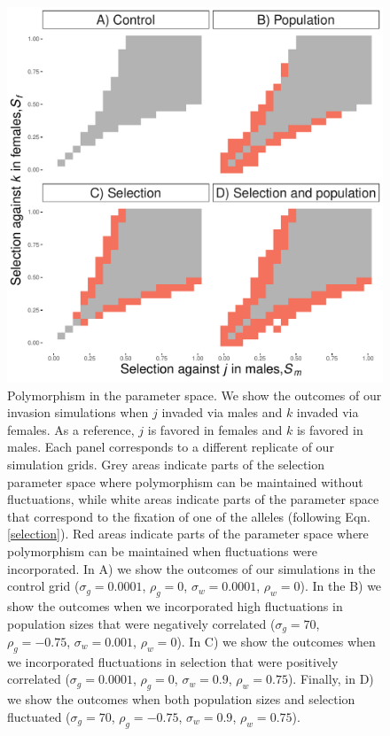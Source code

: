 \documentclass[12pt]{article}
\begin{document}
\begin{figure}[H]
  \centerline{\includegraphics[width=1\textwidth]{outcomes.pdf}}
  \caption{  Polymorphism in the parameter space. We show the outcomes of our invasion simulations  when $j$ invaded via males and $k$ invaded via females. As a reference, $j$ is favored in females and $k$ is favored in males. Each panel corresponds to a different replicate of our simulation grids. Grey areas indicate parts of the selection parameter space where polymorphism can be maintained without fluctuations, while white areas indicate parts of the parameter space that correspond to the fixation of one of the alleles (following Eqn.\ref{selection}). Red areas indicate parts of the parameter space where polymorphism can be maintained when fluctuations were incorporated. In A) we show the outcomes of our simulations in the control grid ($\sigma_{g}=0.0001$, $\rho_{g}=0$, $\sigma_{w}=0.0001$, $\rho_{w}=0$). In the B) we show the outcomes when we incorporated high fluctuations in population sizes that were negatively correlated ($\sigma_{g}=70$, $\rho_{g}=-0.75$, $\sigma_{w}=0.001$, $\rho_{w}=0$). In C) we show the outcomes when we incorporated fluctuations in selection that were positively correlated  ($\sigma_{g}=0.0001$, $\rho_{g}=0$, $\sigma_{w}=0.9$, $\rho_{w}=0.75$). Finally, in D) we show the outcomes when both population sizes and selection fluctuated ($\sigma_{g}=70$, $\rho_{g}=-0.75$, $\sigma_{w}=0.9$, $\rho_{w}=0.75$). }
    \label{fig:outcomes}
\end{figure}
\end{document}

